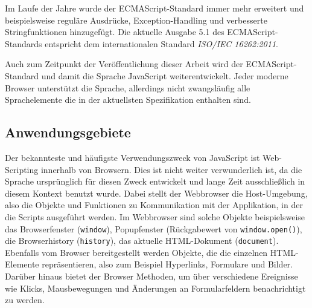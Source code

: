 Im Laufe der Jahre wurde der ECMAScript-Standard immer mehr erweitert und beispielsweise reguläre
Ausdrücke, Exception-Handling und verbesserte Stringfunktionen hinzugefügt. Die aktuelle Ausgabe 5.1
des ECMAScript-Standards entspricht dem internationalen Standard \emph{ISO/IEC 16262:2011}.
\citep{ecmascript}

Auch zum Zeitpunkt der Veröffentlichung dieser Arbeit wird der ECMAScript-Standard und damit die
Sprache JavaScript weiterentwickelt. Jeder moderne Browser unterstützt die Sprache, allerdings
nicht zwangsläufig alle Sprachelemente die in der aktuellsten Spezifikation enthalten sind.


\subsection{Anwendungsgebiete}

Der bekannteste und häufigste Verwendungszweck von JavaScript ist Web-Scripting innerhalb von
Browsern. Dies ist nicht weiter verwunderlich ist, da die Sprache ursprünglich für diesen Zweck
entwickelt und lange Zeit ausschließlich in diesem Kontext benutzt wurde. Dabei stellt der
Webbrowser die Host-Umgebung, also die Objekte und Funktionen zu Kommunikation mit der Applikation,
in der die Scripts ausgeführt werden. Im Webbrowser sind solche Objekte beispielsweise das
Browserfenster (\lstinline{window}), Popupfenster (Rückgabewert von \lstinline{window.open()}),
die Browserhistory (\lstinline{history}), das aktuelle HTML-Dokument (\lstinline{document}).
Ebenfalls vom Browser bereitgestellt werden Objekte, die die einzelnen HTML-Elemente repräsentieren,
also zum Beispiel Hyperlinks, Formulare und Bilder. Darüber hinaus bietet der Browser Methoden, um
über verschiedene Ereignisse wie Klicks, Mausbewegungen und Änderungen an Formularfeldern
benachrichtigt zu werden.
\citep[Kap. 4.1]{ecmascript}

